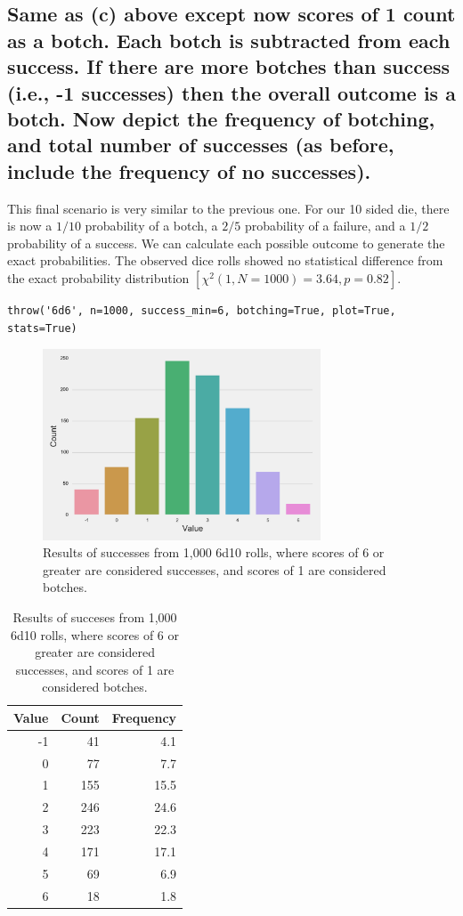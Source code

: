 \documentclass[twocolumn,letterpaper]{article}  %
\begin{document}
\subsection{Same as (c) above except now scores of 1 count as a botch. Each botch is subtracted from each success. If there are more botches than success (i.e., -1 successes) then the overall outcome is a botch. Now depict the frequency of botching, and total number of successes (as before, include the frequency of no successes).}

This final scenario is very similar to the previous one. For our 10 sided die, there is now a $1/10$ probability of a botch, a $2/5$ probability of a failure, and a $1/2$ probability of a success. We can calculate each possible outcome to generate the exact probabilities. The observed dice rolls showed no statistical difference from the exact probability distribution $[\chi^2 (1,N=1000)=3.64, p=0.82]$.

\begin{lstlisting}
throw('6d6', n=1000, success_min=6, botching=True, plot=True, stats=True)
\end{lstlisting}
\begin{figure}[H]
\centering
\includegraphics[width=3.25in]{6d10_min6_botching.pdf}
\caption{Results of successes from 1,000 6d10 rolls, where scores of 6 or greater are considered successes, and scores of 1 are considered botches.}
\end{figure}

\begin{table}[H]
\begin{center}
\begin{tabular}{*{3}{r}}
\toprule
Value & Count & Frequency \\
\midrule
    -1 &    41 &       4.1 \\
     0 &    77 &       7.7 \\
     1 &   155 &      15.5 \\
     2 &   246 &      24.6 \\
     3 &   223 &      22.3 \\
     4 &   171 &      17.1 \\
     5 &    69 &       6.9 \\
     6 &    18 &       1.8 \\
\bottomrule
\end{tabular}
\end{center}
\caption{Results of succeses from 1,000 6d10 rolls, where scores of 6 or greater are considered successes, and scores of 1 are considered botches.}
\end{table}
\end{document}
